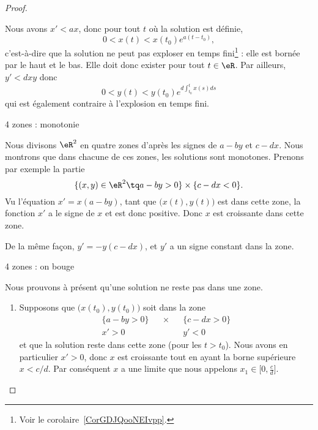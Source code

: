 \begin{proof}
\begin{subproof}
        Nous avons \( x'<ax\), donc pour tout \( t\) où la solution est définie,
        \begin{equation}
            0<x(t)<x(t_0) e^{a(t-t_0)},
        \end{equation}
        c'est-à-dire que la solution ne peut pas exploser en temps fini\footnote{Voir le corolaire~\ref{CorGDJQooNEIvpp}.} : elle est bornée par le haut et le bas. Elle doit donc exister pour tout \( t\in \eR\). Par ailleurs, \( y'<dxy\) donc
        \begin{equation}
            0<y(t)<y(t_0) e^{d\int_{t_0}^{t}x(s)ds}
        \end{equation}
        qui est également contraire à l'explosion en temps fini.

    \item[4 zones : monotonie]

        Nous divisons \( \eR^2\) en quatre zones d'après les signes de \( a-by\) et \( c-dx\). Nous montrons que dans chacune de ces zones, les solutions sont monotones. Prenons par exemple la partie
        \begin{equation}
            \{  (x,y)\in \eR^2\tq   a-by>0 \}\times\{ c-dx<0 \}.
        \end{equation}
        Vu l'équation \( x'=x(a-by)\), tant que \( \big( x(t),y(t) \big)\) est dans cette zone, la fonction \( x'\) a le signe de \( x\) et est donc positive. Donc \( x\) est croissante dans cette zone.

        De la même façon, \( y'=-y(c-dx)\), et \( y'\) a un signe constant dans la zone.

    \item[4 zones : on bouge]

        Nous prouvons à présent qu'une solution ne reste pas dans une zone.

        \begin{enumerate}
            \item
        Supposons que \( \big( x(t_0),y(t_0) \big) \) soit dans la zone
        \begin{subequations}
            \begin{align}
                \{ a-by>0 \}&&\times&& \{ c-dx>0 \}\\
                x'>0&&&&y'<0
            \end{align}
        \end{subequations}
        et que la solution reste dans cette zone (pour les \( t>t_0\)). Nous avons en particulier \( x'>0\), donc \( x\) est croissante tout en ayant la borne supérieure \(  x<c/d \). Par conséquent \( x\) a une limite que nous appelons \( x_1\in \mathopen[ 0 , \frac{ c }{ d } \mathclose]\).


\end{enumerate}
\end{subproof}
\end{proof}
